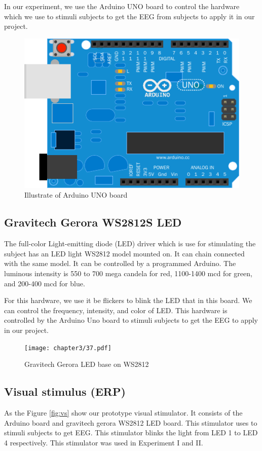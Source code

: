 In our experiment, we use the Arduino UNO board to control the hardware which we use to stimuli subjects to get the EEG from subjects to apply it in our project.
\begin{figure}[ht]
	\centering
	\includegraphics[scale = 0.8]{chapter3/38.pdf}
	\caption{Illustrate of Arduino UNO board}
\end{figure}

\subsection{Gravitech Gerora WS2812S LED}
\hspace{1.5cm} The full-color Light-emitting diode (LED) driver which is use for stimulating the subject has an LED light WS2812 model mounted on. It can chain connected with the same model. It can be controlled by a programmed Arduino. The luminous intensity is 550 to 700 mega candela for red, 1100-1400 mcd for green, and 200-400 mcd for blue.

For this hardware, we use it be flickers to blink the LED that in this board. We can control the frequency, intensity, and color of LED. This hardware is controlled by the Arduino Uno board to stimuli subjects to get the EEG to apply in our project.
\begin{figure}[ht]
	\centering
	\texttt{[image: chapter3/37.pdf]}
	\caption{Gravitech Gerora LED base on WS2812}
\end{figure}

\subsection{Visual stimulus (ERP)}
\hspace{1.5cm} As the Figure \ref{fig:vs} show our prototype visual stimulator. It consists of the Arduino board and gravitech gerora WS2812 LED board. This stimulator uses to stimuli subjects to get EEG. This stimulator blinks the light from LED 1 to LED 4 respectively. This stimulator was used in Experiment I and II.

